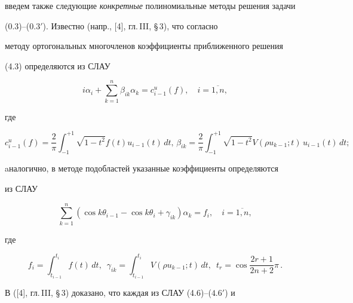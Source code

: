 введем также следующие {\it конкретные} полиномиальные методы решения задачи


(0.3)--($0.3'$). Известно (напр., [4], гл.\,III, \S\,3), что согласно


методу ортогональных многочленов коэффициенты приближенного решения


(4.3) определяются из СЛАУ


\begin{equation}


i\alpha_i+\sum_{k=1}^n\beta_{ik}\alpha_k=c_{i-1}^u(f),\quad


i=\overline{1,n},


\end{equation}


где


\begin{equation}


c_{i-1}^u(f)=\frac{2}{\pi}\int_{-1}^{+1}\sqrt{1-t^2}f(t)u_{i-1}(t)


\, dt,\,


\beta_{ik}=\frac{2}{\pi}\int_{-1}^{+1}\sqrt{1-t^2}


V(\rho u_{k-1};t)\, u_{i-1}(t)\, dt;


\tag{$4.6'$}


\end{equation}


aналогично, в методе подобластей указанные коэффициенты определяются


из СЛАУ


\begin{equation}


\sum_{k=1}^n(\cos{k\theta_{i-1}}-\cos{k\theta_i}+\gamma_{ik})


\alpha_k=f_i,\quad i=\overline{1,n},


\end{equation}


где


\begin{equation}


f_i=\int_{t_{i-1}}^{t_i}f(t)\, dt,\ \;


\gamma_{ik}=\int_{t_{i-1}}^{t_i}V(\rho u_{k-1};t)\, dt,\ \;


t_r=\cos \frac{2r+1}{2n+2}\pi \, .


\tag{$4.7'$}


\end{equation}





В ([4], гл.\,III, \S\,3) доказано, что каждая из СЛАУ (4.6)--($4.6'$) и


